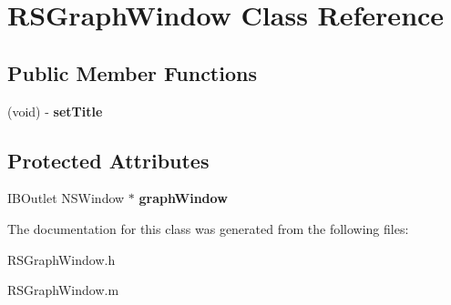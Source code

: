 \hypertarget{interface_r_s_graph_window}{
\section{RSGraphWindow Class Reference}
\label{interface_r_s_graph_window}
}
\subsection*{Public Member Functions}
\begin{DoxyCompactItemize}
\item 
\hypertarget{interface_r_s_graph_window_a87db2c7d923f910b059c75ef9f106828}{
(void) -\/ {\bfseries setTitle}}
\label{interface_r_s_graph_window_a87db2c7d923f910b059c75ef9f106828}

\end{DoxyCompactItemize}
\subsection*{Protected Attributes}
\begin{DoxyCompactItemize}
\item 
\hypertarget{interface_r_s_graph_window_a3d4c0106feb6aae6921fa207bc9f7663}{
IBOutlet NSWindow $\ast$ {\bfseries graphWindow}}
\label{interface_r_s_graph_window_a3d4c0106feb6aae6921fa207bc9f7663}

\end{DoxyCompactItemize}


The documentation for this class was generated from the following files:\begin{DoxyCompactItemize}
\item 
RSGraphWindow.h\item 
RSGraphWindow.m\end{DoxyCompactItemize}
